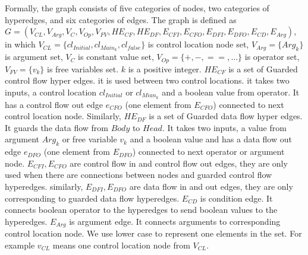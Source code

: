 \documentclass{article}
\begin{document}
Formally, the graph consists of five categories of nodes, two categories of hyperedges, and six categories of edges. The graph is defined as $G=(V_{CL},V_{Arg},V_{C},V_{Op},V_{FV},HE_{CF},HE_{DF},E_{CFI},E_{CFO},E_{DFI},E_{DFO},E_{CD},E_{Arg})$, in which $V_{CL}=\{cl_{Initial},cl_{Main_{k}},cl_{false}\}$ is control location node set, $V_{Arg}=\{Arg_{k}\}$ is argument set, $V_{C}$ is constant value set, $V_{Op}=\{+,-,==,...\}$ is operator set,$V_{FV}=\{v_{k}\}$ is free variables set. $k$ is a positive integer. $HE_{CF}$ is a set of Guarded control flow hyper edges. it is used between two control locations. it takes two inputs, a control location $cl_{Initial}$ or $cl_{Mian_{k}}$ and a boolean value from operator. It has a control flow out edge $e_{CFO}$ (one element from $E_{CFO}$) connected to next control location node. Similarly, $HE_{DF}$ is a set of Guarded data flow hyper edges. It guards the data flow from $Body$ to $Head$. It takes two inputs, a value from argument $Arg_{k}$ or free variable $v_{k}$ and a boolean value and has a data flow out edge $e_{DFO}$ (one element from $E_{DFO}$) connected to next operator or argument node. $E_{CFI},E_{CFO}$ are control flow in and control flow out edges, they are only used when there are connections between nodes and guarded control flow hyperedges. similarly, $E_{DFI},E_{DFO}$ are data flow in and out edges, they are only corresponding to guarded data flow hyperedges. $E_{CD}$ is condition edge. It connects boolean operator to the hyperedges to send boolean values to the hyperedges. $E_{Arg}$ is argument edge. It connects arguments to corresponding control location node. We use lower case to represent one elements in the set. For example $v_{CL}$ means one control location node from $V_{CL}$.
\end{document}
